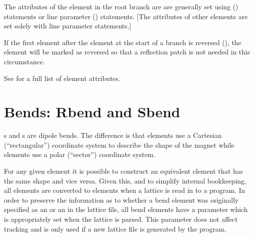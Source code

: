 The attributes of the  element in the root branch are are generally set using
 () statements or line parameter () statements.
[The attributes of other  elements are set solely with line parameter statements.]

If the first element after the  element at the start of a branch is reversed
(), the  element will be marked as reversed so that a
reflection patch is not needed in this circumstance.

See  for a full list of element attributes.

\newpage

\section{Bends: Rbend and Sbend}
\label{s:bend}

s and s are dipole bends. The difference is that  elements use a
Cartesian (``rectangular'') coordinate system to describe the shape of the magnet while 
elements use a polar (``sector'') coordinate system. 

For any given  element it is possible to construct an equivalent  element that
has the same shape and vice versa. Given this, and to simplify internal bookkeeping, all 
elements are converted to  elements when a lattice is read in to a program.  In order to
preserve the information as to whether a bend element was originally specified as an  or
an  in the lattice file, all bend elements have a  parameter which is
appropriately set when the lattice is parsed. This  parameter does not affect tracking and
is only used if a new lattice file is generated by the program.

